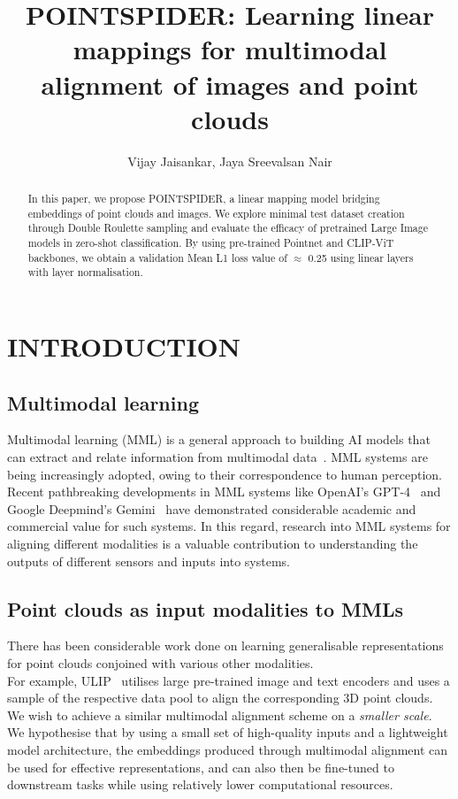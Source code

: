 \documentclass[letterpaper, 10 pt, conference]{ieeeconf}  %
\title{\LARGE \bf
    POINTSPIDER: Learning linear mappings for multimodal alignment of images and point clouds
}
\author{Vijay Jaisankar, Jaya Sreevalsan Nair}
\begin{document}
\maketitle
\thispagestyle{empty}
\pagestyle{empty}


\begin{abstract}
In this paper, we propose POINTSPIDER, a linear mapping model bridging embeddings of point clouds and images. We explore minimal test dataset creation through Double Roulette sampling and evaluate the efficacy of pretrained Large Image models in zero-shot classification. By using pre-trained Pointnet and CLIP-ViT backbones, we obtain a validation Mean L1 loss value of $\approx$ 0.25 using linear layers with layer normalisation.
\end{abstract}

\section{INTRODUCTION}
\label{intro}

\subsection{Multimodal learning}
\label{intro:multimodal}
Multimodal learning (MML) is a general approach to building AI models that can extract and relate information from multimodal data~\cite{10123038}. MML systems are being increasingly adopted, owing to their correspondence to human perception. Recent pathbreaking developments in MML systems like OpenAI's GPT-4~\cite{openai2023gpt4} and Google Deepmind's Gemini~\cite{gemini2023} have demonstrated considerable academic and commercial value for such systems. In this regard, research into MML systems for aligning different modalities is a valuable contribution to understanding the outputs of different sensors and inputs into systems.

\subsection{Point clouds as input modalities to MMLs}
\label{intro:pointclouds}
There has been considerable work done on learning generalisable representations for point clouds conjoined with various other modalities. 
\\
For example, ULIP~\cite{Xue_2023_CVPR} utilises large pre-trained image and text encoders and uses a sample of the respective data pool to align the corresponding 3D point clouds. 
\\ 
We wish to achieve a similar multimodal alignment scheme on a \textit{smaller scale}. We hypothesise that by using a small set of high-quality inputs and a lightweight model architecture, the embeddings produced through multimodal alignment can be used for effective representations, and can also then be fine-tuned to downstream tasks while using relatively lower computational resources. 
\end{document}
